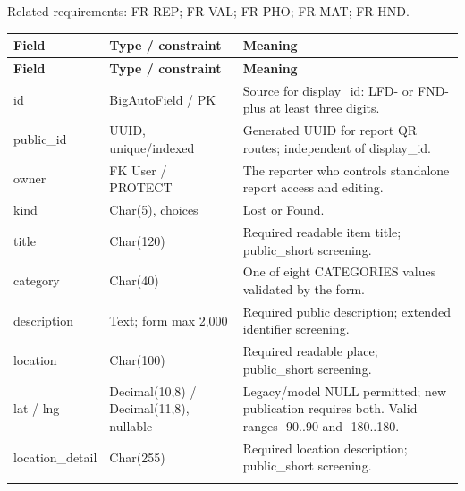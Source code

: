 \documentclass[12pt,a4paper,oneside]{report}
\begin{document}
Related requirements: FR-REP; FR-VAL; FR-PHO; FR-MAT; FR-HND.

\begin{longtable}{@{}P{0.24\dimexpr\textwidth-24pt\relax}P{0.28\dimexpr\textwidth-24pt\relax}P{0.48\dimexpr\textwidth-24pt\relax}@{}}

\toprule \textbf{Field} & \textbf{Type / constraint} & \textbf{Meaning} \\ \midrule\endfirsthead

\toprule \textbf{Field} & \textbf{Type / constraint} & \textbf{Meaning} \\ \midrule\endhead

\bottomrule\endfoot

id & BigAutoField / PK & Source for display\_id: LFD- or FND- plus at least three digits. \\ \addlinespace[3pt]

public\_id & UUID, unique/indexed & Generated UUID for report QR routes; independent of display\_id. \\ \addlinespace[3pt]

owner & FK User / PROTECT & The reporter who controls standalone report access and editing. \\ \addlinespace[3pt]

kind & Char(5), choices & Lost or Found. \\ \addlinespace[3pt]

title & Char(120) & Required readable item title; public\_short screening. \\ \addlinespace[3pt]

category & Char(40) & One of eight CATEGORIES values validated by the form. \\ \addlinespace[3pt]

description & Text; form max 2,000 & Required public description; extended identifier screening. \\ \addlinespace[3pt]

location & Char(100) & Required readable place; public\_short screening. \\ \addlinespace[3pt]

lat / lng & Decimal(10,8) / Decimal(11,8), nullable & Legacy/model NULL permitted; new publication requires both. Valid ranges -90..90 and -180..180. \\ \addlinespace[3pt]

location\_detail & Char(255) & Required location description; public\_short screening. \\ \addlinespace[3pt]


\end{longtable}
\end{document}
